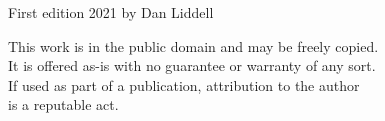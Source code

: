 
  \thispagestyle{plain}	

{ \clearpage 
  \raggedright
  \vspace*{5.5in}  
  \small\sffamily
  First edition 2021 by Dan Liddell\\[1em] 
  \begin{minipage}{0.85\linewidth}
  	This work is in the public domain and may be freely copied.\\
  	It is offered as-is with no guarantee or warranty of any sort.\\
  	If used as part of a publication, attribution to the author \\
  	is a reputable act.
  \end{minipage}
}